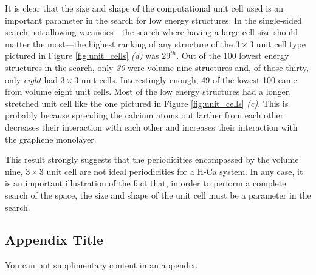 \documentclass[oneside, noacknowlegments]{BYUPhys}
\begin{document}
It is clear that the size and shape of the computational unit cell used is an important parameter in the search for low energy structures. In the single-sided search not allowing vacancies---the search where having a large cell size should matter the most---the highest ranking of any structure of the $3 \times 3$ unit cell type pictured in Figure \ref{fig:unit_cells} \textit{(d)} was $\mathrm{29}^{th}$. Out of the 100 lowest energy structures in the search, only \textit{30} were volume nine structures and, of those thirty, only \textit{eight} had $3 \times 3$ unit cells. Interestingly enough, 49 of the lowest 100 came from volume eight unit cells. Most of the low energy structures had a longer, stretched unit cell like the one pictured in Figure \ref{fig:unit_cells} \textit{(c)}. This is probably because spreading the calcium atoms out farther from each other decreases their interaction with each other and increases their interaction with the graphene monolayer. 

This result strongly suggests that the periodicities encompassed by the volume nine, $3 \times 3$ unit cell are not ideal periodicities for a H-Ca system. In any case, it is an important illustration of the fact that, in order to perform a complete search of the space, the size and shape of the unit cell must be a parameter in the search.

\begin{appendices}

\chapter{Appendix Title}
\label{sec:appendixname}

You can put supplimentary content in an appendix.

\end{appendices}



 \printindex
\end{document}
